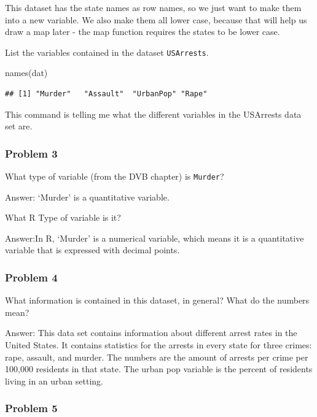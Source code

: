 \documentclass[
]{article}
\newenvironment{Shaded}{\begin{snugshade}}{\end{snugshade}}
\newcommand{\FunctionTok}[1]{\textcolor[rgb]{0.00,0.00,0.00}{#1}}
\newcommand{\NormalTok}[1]{#1}
\begin{document}
This dataset has the state names as row names, so we just want to make
them into a new variable. We also make them all lower case, because that
will help us draw a map later - the map function requires the states to
be lower case.

List the variables contained in the dataset \texttt{USArrests}.

\begin{Shaded}
\begin{Highlighting}[]
\FunctionTok{names}\NormalTok{(dat)}
\end{Highlighting}
\end{Shaded}

\begin{verbatim}
## [1] "Murder"   "Assault"  "UrbanPop" "Rape"
\end{verbatim}

This command is telling me what the different variables in the USArrests
data set are.

\hypertarget{problem-3}{%
\subsubsection{Problem 3}\label{problem-3}}

What type of variable (from the DVB chapter) is \texttt{Murder}?

Answer: `Murder' is a quantitative variable.

What R Type of variable is it?

Answer:In R, `Murder' is a numerical variable, which means it is a
quantitative variable that is expressed with decimal points.

\hypertarget{problem-4}{%
\subsubsection{Problem 4}\label{problem-4}}

What information is contained in this dataset, in general? What do the
numbers mean?

Answer: This data set contains information about different arrest rates
in the United States. It contains statistics for the arrests in every
state for three crimes: rape, assault, and murder. The numbers are the
amount of arrests per crime per 100,000 residents in that state. The
urban pop variable is the percent of residents living in an urban
setting.

\hypertarget{problem-5}{%
\subsubsection{Problem 5}\label{problem-5}}
\end{document}
